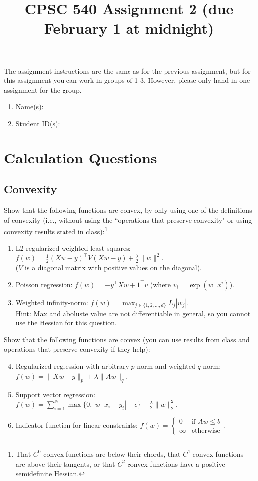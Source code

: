 \documentclass{article}
\def\blu#1{{\color{blu}#1}}
\def\norm#1{\|#1\|}
\def\half{\frac 1 2}
\def\enum#1{\begin{enumerate}#1\end{enumerate}}
\begin{document}
\title{CPSC 540 Assignment 2 (due February 1 at midnight)}
\author{}
\date{}
\maketitle
\vspace{-4em}

The assignment instructions are the same as for the previous assignment, but for this assignment you can work in groups of 1-3. However, please only hand in one assignment for the group.


\blu{\enum{
\item Name(s):
\item Student ID(s):
}}




\section{Calculation Questions}


\subsection{Convexity}

\blu{Show that the following functions are convex, by only using one of the definitions of convexity (i.e., without using the ``operations that preserve convexity" or using convexity results stated in class)}:\footnote{That $C^0$ convex functions are below their chords, that $C^1$ convex functions are above their tangents, or that $C^2$ convex functions have a positive semidefinite Hessian.}
\enum{
\item L2-regularized weighted least squares: $f(w) = \half(Xw - y)^\top V(Xw-y)  + \frac \lambda 2 \norm{w}^2$.\\($V$ is a diagonal matrix with positive values on the diagonal).
\item Poisson regression: $f(w) = -y^\top Xw + 1^\top v$ (where $v_i = \exp(w^\top x^i)$).
\item Weighted infinity-norm: $f(w) = \max_{j \in \{1,2,\dots,d\}}L_j|w_j|$.\\
Hint: Max and aboluste value are not differentiable in general, so you cannot use the Hessian for this question.
}

\blu{Show that the following functions are convex (you can use results from class and operations that preserve convexity if they help)}:
\enum{
\setcounter{enumi}{3}
\item Regularized regression with arbitrary $p$-norm and weighted $q$-norm: $f(w) = \norm{Xw - y}_p + \lambda\norm{Aw}_q$.
\item Support vector regression: $f(w) = \sum_{i=1}^N\max\{0, |w^\top x_i - y_i| - \epsilon\} + \frac{\lambda}{2}\norm{w}_2^2$.
\item Indicator function for linear constraints: $f(w) = \begin{cases}0 & \text{if $Aw \leq b$}\\\infty & \text{otherwise}\end{cases}$.
}
\end{document}
